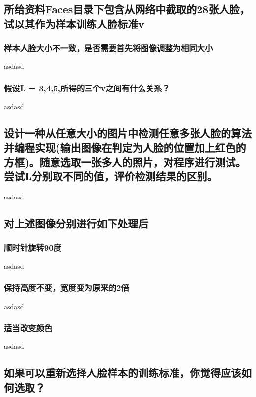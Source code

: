 \documentclass[a4paper]{article}
\begin{document}
	\subsection{所给资料Faces目录下包含从网络中截取的28张人脸，试以其作为样本训练人脸标准v}
	\subsubsection{样本人脸大小不一致，是否需要首先将图像调整为相同大小}
	
	asdasd
	
	\subsubsection{假设L = 3,4,5,所得的三个v之间有什么关系？}
	
	asdasd
	
	\subsection{设计一种从任意大小的图片中检测任意多张人脸的算法并编程实现(输出图像在判定为人脸的位置加上红色的方框)。随意选取一张多人的照片，对程序进行测试。尝试L分别取不同的值，评价检测结果的区别。}
	
	asdasd
	
	\subsection{对上述图像分别进行如下处理后}
	\subsubsection{顺时针旋转90度}
	
	asdasd
	
	\subsubsection{保持高度不变，宽度变为原来的2倍}
	
	asdasd
	
	\subsubsection{适当改变颜色}
	
	asdasd
	
	
	\subsection{如果可以重新选择人脸样本的训练标准，你觉得应该如何选取？}
	
\end{document}
